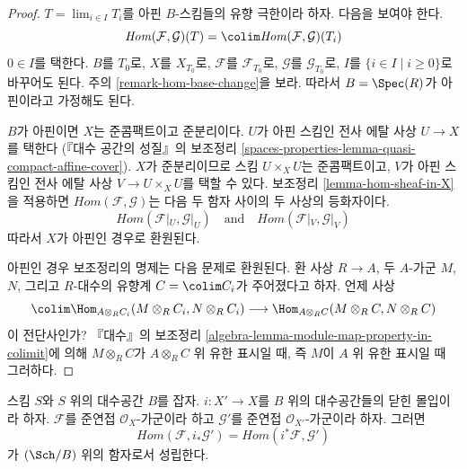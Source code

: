 \begin{proof}
$T = \lim_{i \in I} T_i$를 아핀 $B$-스킴들의 유향 극한이라 하자.
다음을 보여야 한다.
$$
\mathit{Hom}(\mathcal{F}, \mathcal{G})(T) =
\colim \mathit{Hom}(\mathcal{F}, \mathcal{G})(T_i)
$$
$0 \in I$를 택한다. $B$를 $T_0$로, $X$를 $X_{T_0}$로,
$\mathcal{F}$를 $\mathcal{F}_{T_0}$로, $\mathcal{G}$를
$\mathcal{G}_{T_0}$로, $I$를 $\{i \in I \mid i \geq 0\}$로
바꾸어도 된다. 주의 \ref{remark-hom-base-change}을 보라.
따라서 $B = \Spec(R)$가 아핀이라고 가정해도 된다.

\medskip\noindent
$B$가 아핀이면 $X$는 준콤팩트이고 준분리이다.
$U$가 아핀 스킴인 전사 에탈 사상 $U \to X$를 택한다
(『대수 공간의 성질』의 보조정리
\ref{spaces-properties-lemma-quasi-compact-affine-cover}).
$X$가 준분리이므로 스킴 $U \times_X U$는 준콤팩트이고,
$V$가 아핀 스킴인 전사 에탈 사상 $V \to U \times_X U$를
택할 수 있다. 보조정리 \ref{lemma-hom-sheaf-in-X}을 적용하면
$\mathit{Hom}(\mathcal{F}, \mathcal{G})$는 다음 두 함자 사이의
두 사상의 등화자이다.
$$
\mathit{Hom}(\mathcal{F}|_U, \mathcal{G}|_U)
\quad\text{and}\quad
\mathit{Hom}(\mathcal{F}|_V, \mathcal{G}|_V)
$$
따라서 $X$가 아핀인 경우로 환원된다.

\medskip\noindent
아핀인 경우 보조정리의 명제는 다음 문제로 환원된다.
환 사상 $R \to A$, 두 $A$-가군 $M$, $N$, 그리고
$R$-대수의 유향계 $C = \colim C_i$가 주어졌다고 하자.
언제 사상
$$
\colim \Hom_{A \otimes_R C_i}(M \otimes_R C_i, N \otimes_R C_i)
\longrightarrow
\Hom_{A \otimes_R C}(M \otimes_R C, N \otimes_R C)
$$
이 전단사인가? 『대수』의 보조정리
\ref{algebra-lemma-module-map-property-in-colimit}에 의해
$M \otimes_R C$가 $A \otimes_R C$ 위 유한 표시일 때,
즉 $M$이 $A$ 위 유한 표시일 때 그러하다.
\end{proof}

\begin{lemma}
\label{lemma-hom-closed}
스킴 $S$와 $S$ 위의 대수공간 $B$를 잡자.
$i : X' \to X$를 $B$ 위의 대수공간들의 닫힌 몰입이라 하자.
$\mathcal{F}$를 준연접 $\mathcal{O}_X$-가군이라 하고
$\mathcal{G}'$를 준연접 $\mathcal{O}_{X'}$-가군이라 하자. 그러면
$$
\mathit{Hom}(\mathcal{F}, i_*\mathcal{G}') =
\mathit{Hom}(i^*\mathcal{F}, \mathcal{G}')
$$
가 $(\Sch/B)$ 위의 함자로서 성립한다.
\end{lemma}

